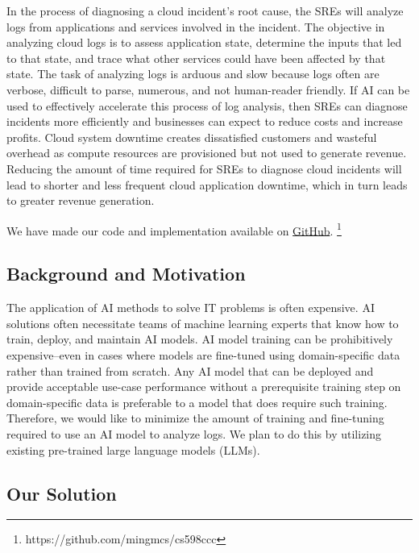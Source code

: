 \documentclass[conference]{IEEEtran}
\begin{document}
In the process of diagnosing a cloud incident's root cause, the SREs will analyze logs from applications and services involved in the incident. The objective in analyzing cloud logs is to assess application state, determine the inputs that led to that state, and trace what other services could have been affected by that state. The task of analyzing logs is arduous and slow because logs often are verbose, difficult to parse, numerous, and not human-reader friendly. If AI can be used to effectively accelerate this process of log analysis, then SREs can diagnose incidents more efficiently and businesses can expect to reduce costs and increase profits. \cite{10212414} \cite{gupta2023learning} Cloud system downtime creates dissatisfied customers and wasteful overhead as compute resources are provisioned but not used to generate revenue. \cite{li2022an} Reducing the amount of time required for SREs to diagnose cloud incidents will lead to shorter and less frequent cloud application downtime, which in turn leads to greater revenue generation.

We have made our code and implementation available on \href{https://github.com/mingmcs/cs598ccc}{GitHub}. \footnote{https://github.com/mingmcs/cs598ccc}

\subsection{Background and Motivation}

The application of AI methods to solve IT problems is often expensive. \cite{LEE2023110689} \cite{network-log-anomaly-detection} AI solutions often necessitate teams of machine learning experts that know how to train, deploy, and maintain AI models. \cite{aiops-challenges} AI model training can be prohibitively expensive--even in cases where models are fine-tuned using domain-specific data rather than trained from scratch. Any AI model that can be deployed and provide acceptable use-case performance without a prerequisite training step on domain-specific data is preferable to a model that does require such training. Therefore, we would like to minimize the amount of training and fine-tuning required to use an AI model to analyze logs. We plan to do this by utilizing existing pre-trained large language models (LLMs).

\subsection{Our Solution}
\end{document}
